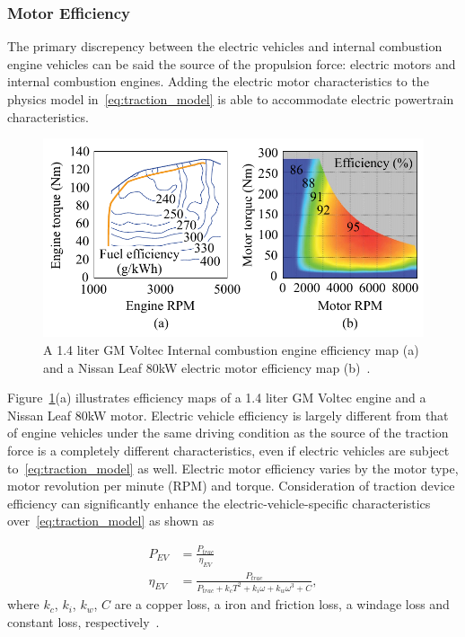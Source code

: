 \subsubsection{Motor Efficiency} \label{subsubsec:motor_eff}

The primary discrepency between the electric vehicles and internal combustion engine vehicles can be said the source of the propulsion force: electric motors and internal combustion engines. Adding the electric motor characteristics to the physics model in~\eqref{eq:traction_model} is able to accommodate electric powertrain characteristics.

\begin{figure}
\centering
\includegraphics[width=1.0\hsize]{Figures/Naehyuck_Chang/motor_engine_torque_map.pdf}
\caption{A 1.4 liter GM Voltec Internal combustion engine efficiency map (a) and a Nissan Leaf 80kW electric motor efficiency map (b)~\cite{Nissan:SAE11, Grebe:ATZ11}.}
\label{fig:torque_map}
\end{figure}      

Figure~\ref{fig:torque_map}(a) illustrates efficiency maps of a 1.4 liter GM Voltec engine and a Nissan Leaf 80kW motor. Electric vehicle efficiency is largely different from that of engine vehicles under the same driving condition as the source of the traction force is a completely different characteristics, even if electric vehicles are subject to~\eqref{eq:traction_model} as well. Electric motor efficiency varies by the motor type, motor revolution per minute (RPM) and torque. Consideration of traction device efficiency can significantly enhance the electric-vehicle-specific characteristics over~\eqref{eq:traction_model} as shown as

\begin{align} \label{eq:motor_eff_model}
P_{EV} &= \frac{P_{trac}}{\eta_{EV}} \\
\eta_{EV} &= \frac{P_{trac}}{{P_{trac} + k_c T^2 + k_i \omega + k_w \omega^3 + C}}, \nonumber
\end{align}
%
where $k_c$, $k_i$, $k_w$, $C$ are a copper loss, a iron and friction loss, a windage loss and constant loss, respectively~\cite{Vaz:JPS14,Lin:CCA14,Oliva:PHM13,Kachroudi:TVT12}.

